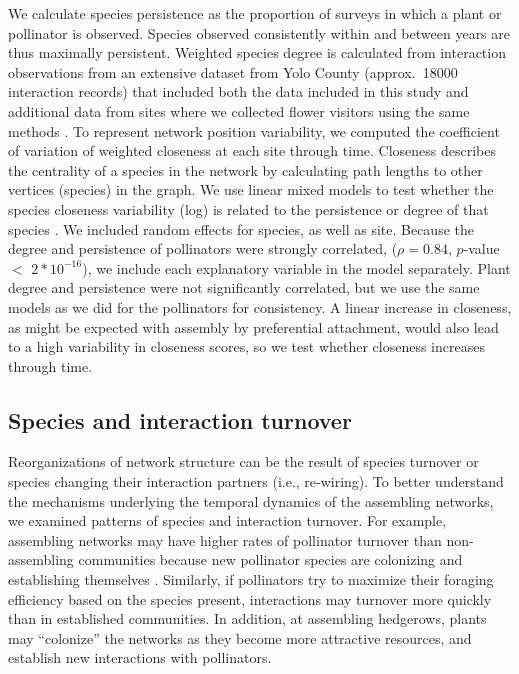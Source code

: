 \documentclass[12pt]{article}
\begin{document}
We calculate species persistence as the proportion of surveys in which
a plant or pollinator is observed. Species observed consistently
within and between years are thus maximally persistent. Weighted
species degree is calculated from interaction observations from an
extensive dataset from Yolo County (approx.~18000 interaction records)
that included both the data included in this study and additional data
from sites where we collected flower visitors using the same methods
\citep{mgonigle-2015-x, ponisio2015farm}. To represent network
position variability, we computed the coefficient of variation of
weighted closeness at each site through time. Closeness describes the
centrality of a species in the network by calculating path lengths to
other vertices (species) in the graph. We use linear mixed models to
test whether the species closeness variability (log) is related to the
persistence or degree of that species \citep{lme4, lmetest}. We
included random effects for species, as well as site. Because the
degree and persistence of pollinators were strongly correlated, ($\rho
= 0.84$, $p$-value $<$ $2*10^{-16}$), we include each explanatory
variable in the model separately. Plant degree and persistence were
not significantly correlated, but we use the same models as we did for
the pollinators for consistency. A linear increase in closeness, as
might be expected with assembly by preferential attachment, would also
lead to a high variability in closeness scores, so we test whether
closeness increases through time.

\subsection*{Species and interaction turnover}

Reorganizations of network structure can be the result of species
turnover or species changing their interaction partners (i.e.,
re-wiring). To better understand the mechanisms underlying the
temporal dynamics of the assembling networks, we examined patterns of
species and interaction turnover. For example, assembling networks may
have higher rates of pollinator turnover than non-assembling
communities because new pollinator species are colonizing and
establishing themselves \citep{mgonigle-2015-x}. Similarly, if
pollinators try to maximize their foraging efficiency based on the
species present, interactions may turnover more quickly than in
established communities. In addition, at assembling hedgerows, plants
may ``colonize'' the networks as they become more attractive
resources, and establish new interactions with pollinators.
\end{document}
